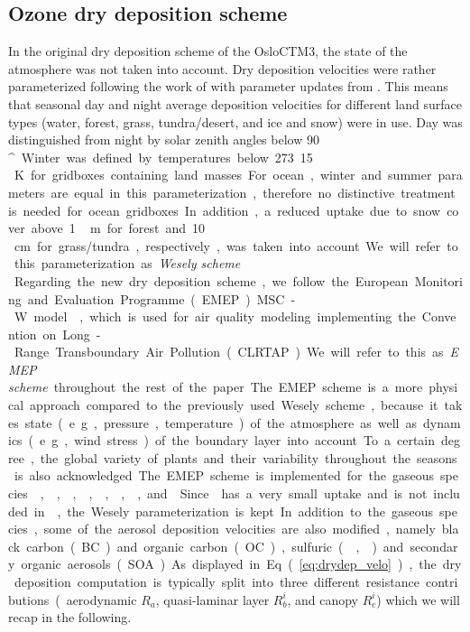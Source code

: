 \documentclass[gmd, manuscript]{copernicus}
\begin{document}
\subsection{Ozone dry deposition scheme}
\label{subsec:DryDep}
In the original dry deposition scheme of the OsloCTM3, the state of the atmosphere was not taken into account. Dry deposition velocities were rather parameterized following the work of \citet{AE:Wesely1989} with parameter updates from \citet{JGR:Hough1991}. This means that seasonal day and night average deposition velocities for different land surface types (water, forest, grass, tundra/desert, and ice and snow) were in use. Day was distinguished from night by solar zenith angles below 90\,\unit{^\circ}. Winter was defined by temperatures below 273.15\,\unit{K} for gridboxes containing land masses. For ocean, winter and summer parameters are equal in this parameterization, therefore no distinctive treatment is needed for ocean gridboxes. In addition, a reduced uptake due to snow cover above 1\,\unit{m} for forest and 10\,\unit{cm} for grass/tundra, respectively, was taken into account. We will refer to this parameterization as \emph{Wesely scheme}.\\

Regarding the new dry deposition scheme, we follow the European Monitoring and Evaluation Programme (EMEP) MSC-W model \citep{WASP:Simpson2003,ACP:Simpson2012}, which is used for air quality modeling implementing the Convention on Long-Range Transboundary Air Pollution (CLRTAP). We will refer to this as \emph{EMEP scheme} throughout the rest of the paper. The EMEP scheme is a more physical approach compared to the previously used Wesely scheme, because it takes state (e.g., pressure, temperature)  of the atmosphere as well as dynamics (e.g., wind stress) of the boundary layer into account. To a certain degree, the global variety of plants and their variability throughout the seasons is also acknowledged. The EMEP scheme is implemented for the gaseous species , , , , , , , and . Since  has a very small uptake and is not included in \citet{WASP:Simpson2003,ACP:Simpson2012}, the Wesely parameterization is kept. In addition to the gaseous species, some of the aerosol deposition velocities are also modified, namely black carbon (BC) and organic carbon (OC), sulfuric (, ) and secondary organic aerosols (SOA). As displayed in Eq.~(\ref{eq:drydep_velo}), the dry deposition computation is typically split into three different resistance contributions (aerodynamic $R_a$, quasi-laminar layer $R^i_b$, and canopy $R^i_c$) which we will recap in the following.
\end{document}
